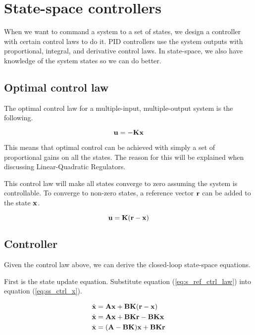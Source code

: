 
\chapter{State-space controllers}

When we want to command a \gls{system} to a set of states, we design a
controller with certain \glspl{control law} to do it. PID controllers use the
system outputs with proportional, integral, and derivative \glspl{control law}.
In state-space, we also have knowledge of the system states so we can do better.

\section{Optimal control law}

The optimal \gls{control law} for a multiple-input, multiple-output system is
the following.

\begin{equation}
  \mathbf{u} = -\mathbf{K}\mathbf{x}
\end{equation}

This means that optimal control can be achieved with simply a set of
proportional gains on all the states. The reason for this will be explained when
discussing Linear-Quadratic Regulators.

This \gls{control law} will make all states converge to zero assuming the system
is controllable. To converge to non-zero states, a reference vector $\mathbf{r}$
can be added to the state $\mathbf{x}$.

\begin{equation}
  \mathbf{u} = \mathbf{K}(\mathbf{r} - \mathbf{x}) \label{eq:s_ref_ctrl_law}
\end{equation}

\section{Controller}

Given the \gls{control law} above, we can derive the closed-loop state-space
equations.

First is the state update equation. Substitute equation
(\ref{eq:s_ref_ctrl_law}) into equation (\ref{eq:ss_ctrl_x}).

\begin{align}
  \dot{\mathbf{x}} &= \mathbf{A}\mathbf{x} + \mathbf{B}\mathbf{K}(\mathbf{r} - \mathbf{x}) \nonumber
    \\
  \dot{\mathbf{x}} &= \mathbf{A}\mathbf{x} + \mathbf{B}\mathbf{K}\mathbf{r} -
    \mathbf{B}\mathbf{K}\mathbf{x} \nonumber \\
  \dot{\mathbf{x}} &= (\mathbf{A} - \mathbf{B}\mathbf{K})\mathbf{x} + \mathbf{B}\mathbf{K}\mathbf{r}
    \label{eq:s_ref_ctrl_x}
\end{align}


